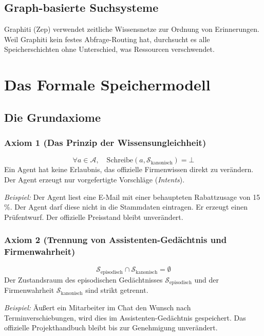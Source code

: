 \documentclass[10pt,journal,compsoc]{IEEEtran}
\begin{document}
\subsection{Graph-basierte Suchsysteme}
Graphiti (Zep) verwendet zeitliche Wissensnetze zur Ordnung von Erinnerungen. Weil Graphiti kein festes Abfrage-Routing hat, durchsucht es alle Speicherschichten ohne Unterschied, was Ressourcen verschwendet.

\section{Das Formale Speichermodell}
\label{sec:formales_speichermodell}

\subsection{Die Grundaxiome}

\subsubsection{Axiom 1 (Das Prinzip der Wissensungleichheit)}
\begin{equation}
\forall a \in \mathcal{A}, \quad \text{Schreibe}(a, \mathcal{S}_{\text{kanonisch}}) = \bot
\end{equation}
Ein Agent hat keine Erlaubnis, das offizielle Firmenwissen direkt zu verändern. Der Agent erzeugt nur vorgefertigte Vorschläge (\emph{Intents}).

\emph{Beispiel:} Der Agent liest eine E-Mail mit einer behaupteten Rabattzusage von 15\,\%. Der Agent darf diese nicht in die Stammdaten eintragen. Er erzeugt einen Prüfentwurf. Der offizielle Preisstand bleibt unverändert.

\subsubsection{Axiom 2 (Trennung von Assistenten-Gedächtnis und Firmenwahrheit)}
\begin{equation}
\mathcal{S}_{\text{episodisch}} \cap \mathcal{S}_{\text{kanonisch}} = \emptyset
\end{equation}
Der Zustandsraum des episodischen Gedächtnisses $\mathcal{S}_{\text{episodisch}}$ und der Firmenwahrheit $\mathcal{S}_{\text{kanonisch}}$ sind strikt getrennt.

\emph{Beispiel:} Äußert ein Mitarbeiter im Chat den Wunsch nach Terminverschiebungen, wird dies im Assistenten-Gedächtnis gespeichert. Das offizielle Projekthandbuch bleibt bis zur Genehmigung unverändert.
\end{document}
